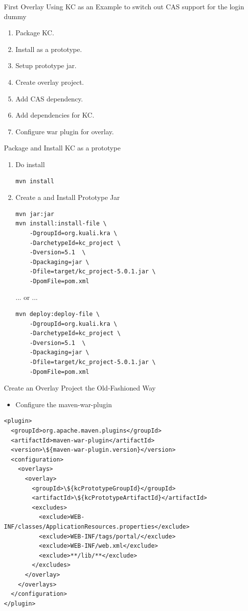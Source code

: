 \documentclass[xcolor=dvipsnames,14pt,professionalfonts]{beamer}
\begin{document}
\begin{frame}{First Overlay}
  Using KC as an Example to switch out CAS support for the login dummy
  \begin{enumerate}
    \item Package KC.
    \item Install as a prototype.
    \item Setup prototype jar.
    \item Create overlay project.
    \item Add CAS dependency.
    \item Add dependencies for KC.
    \item Configure war plugin for overlay.
  \end{enumerate}
\end{frame}

\begin{frame}[fragile]{Package and Install KC as a prototype}
  \begin{enumerate}
  \item Do install
  \begin{verbatim}
mvn install
  \end{verbatim}
  \item Create a and Install Prototype Jar
  \begin{verbatim}
mvn jar:jar
mvn install:install-file \
    -DgroupId=org.kuali.kra \
    -DarchetypeId=kc_project \ 
    -Dversion=5.1  \
    -Dpackaging=jar \
    -Dfile=target/kc_project-5.0.1.jar \
    -DpomFile=pom.xml
  \end{verbatim}
  ... or ...
  \begin{verbatim}
mvn deploy:deploy-file \
    -DgroupId=org.kuali.kra \
    -DarchetypeId=kc_project \ 
    -Dversion=5.1  \
    -Dpackaging=jar \
    -Dfile=target/kc_project-5.0.1.jar \
    -DpomFile=pom.xml
  \end{verbatim}
\end{enumerate}
\end{frame}

\begin{frame}[fragile]{Create an Overlay Project the Old-Fashioned
    Way}
  \begin{itemize}
  \item Configure the maven-war-plugin
  \end{itemize}
  \begin{verbatim}
<plugin>
  <groupId>org.apache.maven.plugins</groupId>
  <artifactId>maven-war-plugin</artifactId>
  <version>\${maven-war-plugin.version}</version>
  <configuration>
    <overlays>
      <overlay>
        <groupId>\${kcPrototypeGroupId}</groupId>
        <artifactId>\${kcPrototypeArtifactId}</artifactId>
        <excludes>
          <exclude>WEB-INF/classes/ApplicationResources.properties</exclude>
          <exclude>WEB-INF/tags/portal/</exclude>
          <exclude>WEB-INF/web.xml</exclude>
          <exclude>**/lib/**</exclude>
        </excludes>
      </overlay>
    </overlays>
  </configuration>
</plugin>
\end{verbatim}
\end{frame}
\end{document}
